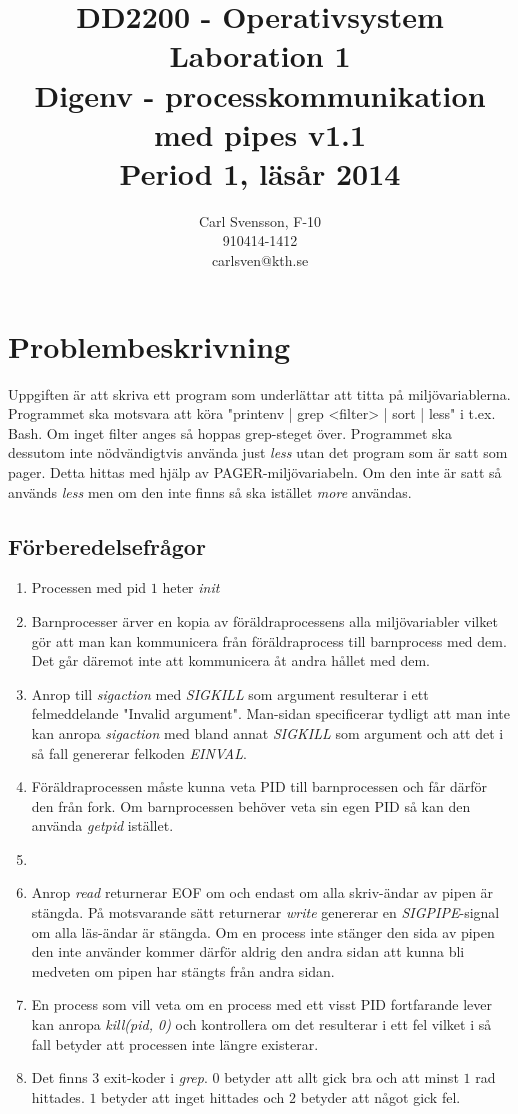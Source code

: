 \documentclass[10pt,a4paper]{article}
\title{DD2200 - Operativsystem \\ Laboration 1 \\ Digenv - processkommunikation med pipes  v1.1 \\ Period 1, läsår 2014}
\author{Carl Svensson, F-10 \\ 910414-1412 \\ carlsven@kth.se}
\date{}
\begin{document}
\maketitle
\clearpage


\section{Problembeskrivning}

Uppgiften är att skriva ett program som underlättar att titta på miljövariablerna. Programmet ska motsvara att köra "printenv | grep <filter> | sort | less" i t.ex. Bash. Om inget filter anges så hoppas grep-steget över.
Programmet ska dessutom inte nödvändigtvis använda just \emph{less} utan det program som är satt som pager. Detta hittas med hjälp av PAGER-miljövariabeln. Om den inte är satt så används \emph{less} men om den inte finns så ska istället \emph{more} användas.

\subsection{Förberedelsefrågor}

\begin{enumerate}
\item Processen med pid $1$ heter \emph{init}
\item Barnprocesser ärver en kopia av föräldraprocessens alla miljövariabler vilket gör att man kan kommunicera från föräldraprocess till barnprocess med dem. Det går däremot inte att kommunicera åt andra hållet med dem.
\item Anrop till \emph{sigaction} med \emph{SIGKILL} som argument resulterar i ett felmeddelande "Invalid argument". Man-sidan specificerar tydligt att man inte kan anropa \emph{sigaction} med bland annat \emph{SIGKILL} som argument och att det i så fall genererar felkoden \emph{EINVAL}. 
\item Föräldraprocessen måste kunna veta PID till barnprocessen och får därför den från fork. Om barnprocessen behöver veta sin egen PID så kan den använda \emph{getpid} istället.
\item 
\item Anrop \emph{read} returnerar EOF om och endast om alla skriv-ändar av pipen är stängda. På motsvarande sätt returnerar \emph{write} genererar en \emph{SIGPIPE}-signal om alla läs-ändar är stängda. Om en process inte stänger den sida av pipen den inte använder kommer därför aldrig den andra sidan att kunna bli medveten om pipen har stängts från andra sidan.
\item En process som vill veta om en process med ett visst PID fortfarande lever kan anropa \emph{kill(pid, 0)} och kontrollera om det resulterar i ett fel vilket i så fall betyder att processen inte längre existerar.
\item Det finns 3 exit-koder i \emph{grep}. $0$ betyder att allt gick bra och att minst $1$ rad hittades. $1$ betyder att inget hittades och $2$ betyder att något gick fel.
\end{enumerate}
\end{document}
